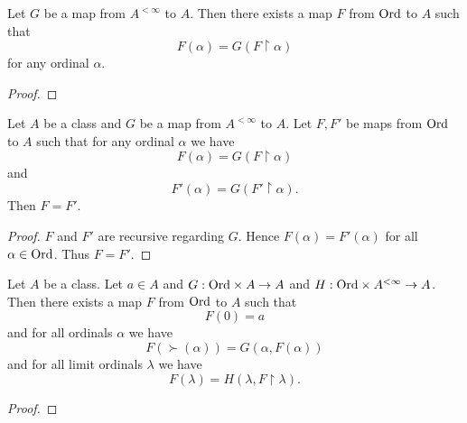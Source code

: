 \documentclass[../set-theory.tex]{subfiles}
\begin{document}
  \begin{forthel}
    \begin{theorem}
      Let $G$ be a map from $A^{< \infty}$ to $A$.
      Then there exists a map $F$ from $\mathrm{Ord}$ to $A$ such that
      \[ F(\alpha) = G(F \restriction \alpha) \]
      for any ordinal $\alpha$.
    \end{theorem}
    \begin{proof}
    \end{proof}
  \end{forthel}

  \begin{forthel}
    \begin{theorem}
      Let $A$ be a class and $G$ be a map from $A^{< \infty}$ to $A$.
      Let $F, F'$ be maps from $\mathrm{Ord}$ to $A$ such that for any ordinal $\alpha$
      we have
      \[ F(\alpha) = G(F \restriction \alpha) \]
      and
      \[ F'(\alpha) = G(F' \restriction \alpha). \]
      Then $F = F'$.
    \end{theorem}
    \begin{proof}
      $F$ and $F'$ are recursive regarding $G$.
      Hence $F(\alpha) = F'(\alpha)$ for all $\alpha \in \mathrm{Ord}$.
      Thus $F = F'$.
    \end{proof}
  \end{forthel}

  \begin{forthel}
    \begin{theorem}
      Let $A$ be a class.
      Let $a \in A$ and $G : \mathrm{Ord} \times A \to A$ and
      $H : \mathrm{Ord} \times A^{< \infty} \to A$.
      Then there exists a map $F$ from $\mathrm{Ord}$ to $A$ such that
      \[ F(0) = a \]
      and for all ordinals $\alpha$ we have
      \[ F(\succ(\alpha)) = G(\alpha, F(\alpha)) \]
      and for all limit ordinals $\lambda$ we have
      \[ F(\lambda) = H(\lambda, F \restriction \lambda). \]
    \end{theorem}
    \begin{proof}
    \end{proof}
  \end{forthel}
\end{document}
